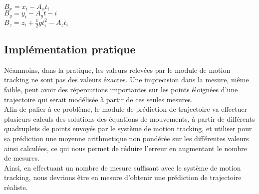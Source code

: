 $B_x = x_i - A_x t_i$\\

$B_y = y_i - A_y t-i$\\

$B_z = z_i + \frac{1}{2} g t_i^2 - A_z t_i$\\

\subsection{Implémentation pratique}

Néanmoins, dans la pratique, les valeurs relevées par le module de motion tracking ne sont pas des valeurs éxactes. Une imprecision dans la mesure, même faible, peut avoir des répercutions importantes sur les points éloignées d'une trajectoire qui serait modélisée à partir de ces seules mesures.\\

Afin de palier à ce problème, le module de prédiction de trajectoire va effectuer plusieurs calculs des solutions des équations de mouvements, à partir de différents quadruplets de points envoyés par le système de motion tracking, et utiliser pour sa prédiction une moyenne arithmetique non pondérée sur les différentes valeurs ainsi calculées, ce qui nous permet de réduire l'erreur en augmentant le nombre de mesures. \\

Ainsi, en effectuant un nombre de mesure suffisant avec le système de motion tracking, nous devrions être en mesure d'obtenir une prédiction de trajectoire réaliste.
\newpage
